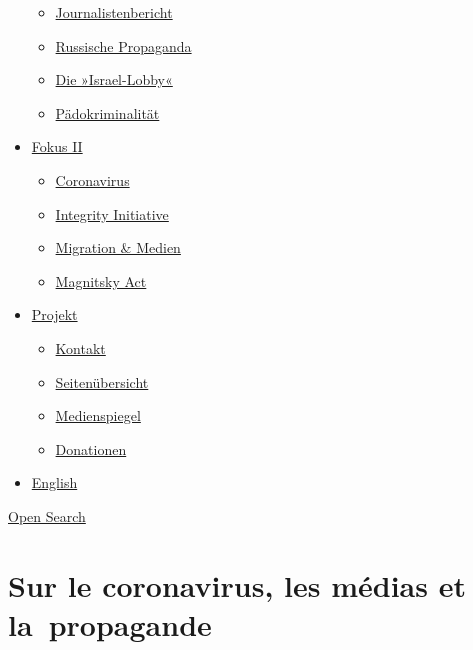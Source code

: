 \begin{itemize}
  \begin{itemize}
  \tightlist
  \item
    \href{https://swprs.org/bericht-eines-journalisten/}{Journalistenbericht}
  \item
    \href{https://swprs.org/russische-propaganda/}{Russische Propaganda}
  \item
    \href{https://swprs.org/die-israel-lobby-fakten-und-mythen/}{Die
    »Israel-Lobby«}
  \item
    \href{https://swprs.org/geopolitik-und-paedokriminalitaet/}{Pädokriminalität}
  \end{itemize}
\item
  \href{https://swprs.org/migration-und-medien/}{Fokus II}

  \begin{itemize}
  \tightlist
  \item
    \href{https://swprs.org/covid-19-hinweis-ii/}{Coronavirus}
  \item
    \href{https://swprs.org/die-integrity-initiative/}{Integrity
    Initiative}
  \item
    \href{https://swprs.org/migration-und-medien/}{Migration \& Medien}
  \item
    \href{https://swprs.org/der-fall-magnitsky/}{Magnitsky Act}
  \end{itemize}
\item
  \href{https://swprs.org/kontakt/}{Projekt}

  \begin{itemize}
  \tightlist
  \item
    \href{https://swprs.org/kontakt/}{Kontakt}
  \item
    \href{https://swprs.org/uebersicht/}{Seitenübersicht}
  \item
    \href{https://swprs.org/medienspiegel/}{Medienspiegel}
  \item
    \href{https://swprs.org/donationen/}{Donationen}
  \end{itemize}
\item
  \href{https://swprs.org/contact/}{English}
\end{itemize}

\protect\hyperlink{}{Open Search}

\hypertarget{sur-le-coronavirus-les-muxe9dias-et-la-propagande}{%
\section{Sur le coronavirus, les médias et
la~propagande}\label{sur-le-coronavirus-les-muxe9dias-et-la-propagande}}

